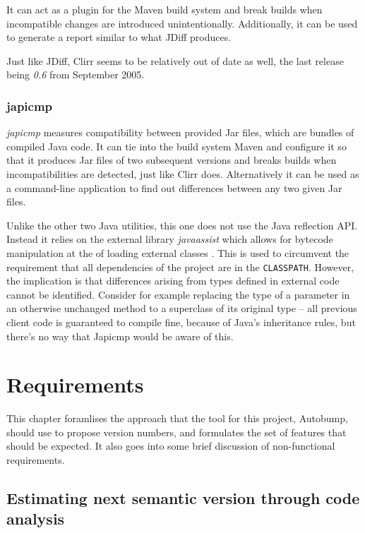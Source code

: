 \documentclass{l4proj}
\newcommand\genericstyle{\lstset{basicstyle=\ttm}}
\newcommand\codeinline[1]{{\genericstyle\lstinline!#1!}}
\begin{document}
It can act as a plugin for the Maven build system and break builds
when incompatible changes are introduced unintentionally.
Additionally, it can be used to generate a report similar to what
JDiff produces.

Just like JDiff, Clirr seems to be relatively out of date as well, the
last release being  \textit{0.6} from September 2005.

\subsection{japicmp}

\textit{japicmp} \cite{Japicmp} measures compatibility between
provided Jar files, which are bundles of compiled Java code. It can
tie into the build system Maven and configure it so that it produces
Jar files of two subsequent versions and breaks builds when
incompatibilities are detected, just like Clirr does. Alternatively it
can be used as a command-line application to find out differences
between any two given Jar files.

Unlike the other two Java utilities, this one does not use the Java
reflection API. Instead it relies on the external library
\textit{javaassist} \cite{JavaAssist} which allows for bytecode
manipulation at the of loading external classes \cite{BytecodeManip}.
This is used to circumvent the requirement that all dependencies of
the project are in the \codeinline{CLASSPATH}. However, the
implication is that differences arising from types defined in external
code cannot be identified. Consider for example replacing the type of
a parameter in an otherwise unchanged method to a superclass of its
original type -- all previous client code is guaranteed to compile
fine, because of Java's inheritance rules, but there's no way that
Japicmp would be aware of this.

\chapter{Requirements}
\label{Requirements}

This chapter foramlises the approach that the tool for this project,
Autobump, should use to propose version numbers, and formulates the
set of features that should be expected. It also goes into some brief
discussion of non-functional requirements.

\section{Estimating next semantic version through code analysis}
\label{EstimatingNextSemver}
\end{document}
